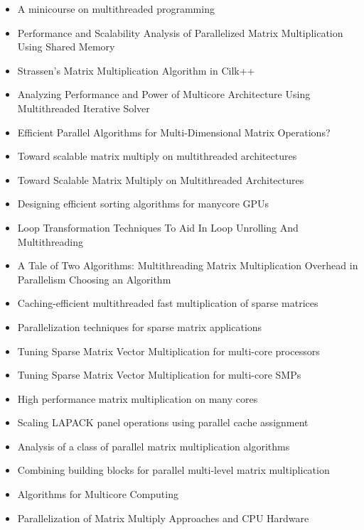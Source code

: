 \begin{itemize}
\item A minicourse on multithreaded programming \cite{Leiserson1998}
\item Performance and Scalability Analysis of Parallelized Matrix
  Multiplication Using Shared Memory \cite{Dinkins2007}
\item Strassen's Matrix Multiplication Algorithm in Cilk++
  \cite{Kuszmaul2009}
\item Analyzing Performance and Power of Multicore Architecture Using
  Multithreaded Iterative Solver \cite{Lee2010}
\item Efficient Parallel Algorithms for Multi-Dimensional Matrix
  Operations? \cite{Liu2000}
\item Toward scalable matrix multiply on multithreaded architectures
  \cite{Marker2007}
\item Toward Scalable Matrix Multiply on Multithreaded Architectures
  \cite{Marker2007a}
\item Designing efficient sorting algorithms for manycore GPUs
  \cite{Satish2009}
\item Loop Transformation Techniques To Aid In Loop Unrolling And
  Multithreading \cite{Song2003}
\item A Tale of Two Algorithms: Multithreading Matrix Multiplication
  Overhead in Parallelism Choosing an Algorithm \cite{Steele2010}
\item Caching-efficient multithreaded fast multiplication of sparse
  matrices \cite{Sulatycke1998}
\item Parallelization techniques for sparse matrix applications
  \cite{Ujaldon1996}
\item Tuning Sparse Matrix Vector Multiplication for multi-core
  processors \cite{Williams2007}
\item Tuning Sparse Matrix Vector Multiplication for multi-core SMPs
  \cite{Williams2007a}
\item High performance matrix multiplication on many cores
  \cite{Yuan2009}
\item Scaling LAPACK panel operations using parallel cache assignment
  \cite{Castaldo2010}
\item Analysis of a class of parallel matrix multiplication algorithms
  \cite{Gunnels1998}
\item Combining building blocks for parallel multi-level matrix
  multiplication \cite{Hunold2008}
\item Algorithms for Multicore Computing \cite{Ramachandran2008}
\item Parallelization of Matrix Multiply Approaches and CPU Hardware

\end{itemize}
